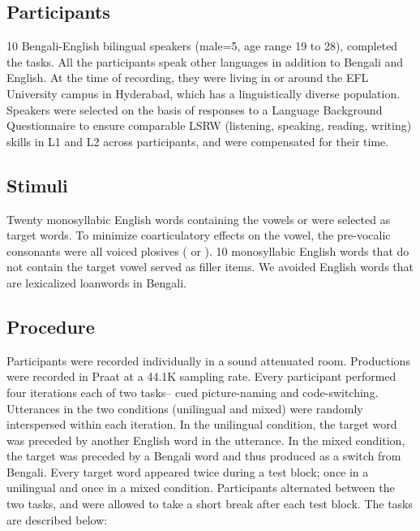 \documentclass[12 pt]{article}
\newcommand{\nt}[1]{\textipa{[#1]}} %
\begin{document}
\subsection{Participants}

10 Bengali-English bilingual speakers (male=5, age range 19 to 28), completed the tasks. All the participants speak other languages in addition to Bengali and English. At the time of recording, they were living in or around the EFL University campus in Hyderabad, which has a linguistically diverse population. Speakers were selected on the basis of responses to a Language Background Questionnaire to ensure comparable LSRW (listening, speaking, reading, writing) skills in L1 and L2 across participants, and were compensated for their time.


\subsection{Stimuli}
Twenty monosyllabic English words containing the vowels \nt{2} or \nt{\ae} were selected as target words. To minimize coarticulatory effects on the vowel, the pre-vocalic consonants were all voiced plosives (\nt{b} or \nt{d}). 10 monosyllabic English words that do not contain the target vowel served as filler items. We avoided English words that are lexicalized loanwords in Bengali. %



\subsection{Procedure}
Participants were recorded individually in a sound attenuated room. %
Productions were recorded in Praat \citep{boersma2016praat} at a 44.1K sampling rate. Every participant performed four iterations each of two tasks-- cued picture-naming and code-switching. Utterances in the two conditions (unilingual and mixed) were randomly interspersed within each iteration. In the unilingual condition, the target word was preceded by another English word in the utterance. In the mixed condition, the target was preceded by a Bengali word and thus produced as a switch from Bengali. Every target word appeared twice during a test block; once in a unilingual and once in a mixed condition. Participants alternated between the two tasks, and were allowed to take a short break after each test block. The tasks are described below:
\end{document}

